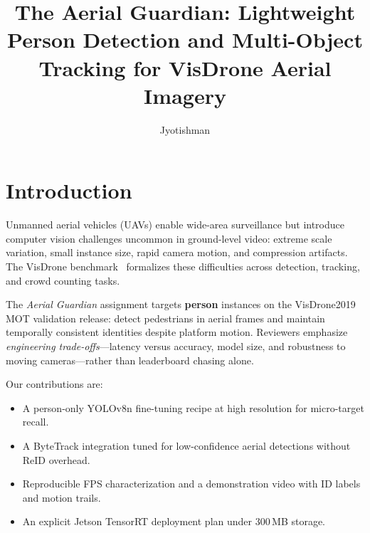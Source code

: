 \documentclass[10pt,twocolumn,letterpaper]{article}
\title{The Aerial Guardian: Lightweight Person Detection and Multi-Object Tracking for VisDrone Aerial Imagery}
\author{Jyotishman}
\begin{document}
\maketitle


\section{Introduction}
\label{sec:intro}

Unmanned aerial vehicles (UAVs) enable wide-area surveillance but introduce computer vision challenges uncommon in ground-level video: extreme scale variation, small instance size, rapid camera motion, and compression artifacts. The VisDrone benchmark~\cite{visdrone} formalizes these difficulties across detection, tracking, and crowd counting tasks.

The \emph{Aerial Guardian} assignment targets \textbf{person} instances on the VisDrone2019 MOT validation release: detect pedestrians in aerial frames and maintain temporally consistent identities despite platform motion. Reviewers emphasize \emph{engineering trade-offs}---latency versus accuracy, model size, and robustness to moving cameras---rather than leaderboard chasing alone.

Our contributions are:
\begin{itemize}[leftmargin=*, nosep]
    \item A person-only YOLOv8n fine-tuning recipe at high resolution for micro-target recall.
    \item A ByteTrack integration tuned for low-confidence aerial detections without ReID overhead.
    \item Reproducible FPS characterization and a demonstration video with ID labels and motion trails.
    \item An explicit Jetson TensorRT deployment plan under 300\,MB storage.
\end{itemize}
\end{document}
